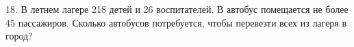 18. В летнем лагере 218 детей и 26 воспитателей. В автобус помещается не более 45 пассажиров. Сколько автобусов потребуется, чтобы перевезти всех из лагеря в город?\\
